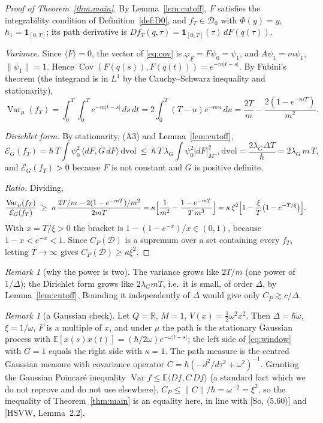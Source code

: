 \documentclass[11pt,a4paper]{article}
\theoremstyle{definition}
\theoremstyle{remark}
\newtheorem{remark}[theorem]{Remark}
\newcommand{\E}{\mathbb{E}}
\newcommand{\R}{\mathbb{R}}
\newcommand{\Var}{\operatorname{Var}}
\newcommand{\Cov}{\operatorname{Cov}}
\newcommand{\cE}{\mathcal{E}}
\newcommand{\cD}{\mathcal{D}}
\newcommand{\dvol}{\,\mathrm{dvol}}
\begin{document}
\begin{proof}[Proof of Theorem~\ref{thm:main}]
By Lemma~\ref{lem:cutoff}, $F$ satisfies the integrability condition of Definition~\ref{def:D0}, and $f_T\in\cD_0$ with $\Phi(y)=y$, $h_1=\mathbf 1_{[0,T]}$; its path derivative is $Df_T(q,\tau)=\mathbf 1_{[0,T]}(\tau)\,dF(q(\tau))$.

\emph{Variance.}
Since $\langle F\rangle=0$, the vector of \eqref{eq:cov} is $\varphi_F=F\psi_0=\psi_1$, and $A\psi_1=m\psi_1$, $\|\psi_1\|=1$.
Hence $\Cov(F(q(s)),F(q(t)))=e^{-m|t-s|}$.
By Fubini's theorem (the integrand is in $L^1$ by the Cauchy--Schwarz inequality and stationarity),
\[
  \Var_\mu(f_T)=\int_0^T\!\!\int_0^Te^{-m|t-s|}\,ds\,dt=2\int_0^T(T-u)e^{-mu}\,du=\frac{2T}{m}-\frac{2(1-e^{-mT})}{m^2}.
\]

\emph{Dirichlet form.}
By stationarity, (A3) and Lemma~\ref{lem:cutoff},
\[
  \cE_G(f_T)=\hbar\,T\int\psi_0^2\,\langle dF,G\,dF\rangle\dvol\ \le\ \hbar\,T\,\lambda_G\int\psi_0^2|dF|^2_{M^{-1}}\dvol=\frac{2\lambda_G\Delta T}{\hbar}=2\lambda_G\,m\,T ,
\]
and $\cE_G(f_T)>0$ because $F$ is not constant and $G$ is positive definite.

\emph{Ratio.}
Dividing,
\[
  \frac{\Var_\mu(f_T)}{\cE_G(f_T)}\ \ge\ \kappa\,\frac{2T/m-2(1-e^{-mT})/m^2}{2mT}=\kappa\Bigl[\frac1{m^2}-\frac{1-e^{-mT}}{T\,m^3}\Bigr]=\kappa\,\xi^2\Bigl[1-\frac{\xi}{T}\bigl(1-e^{-T/\xi}\bigr)\Bigr].
\]
With $x=T/\xi>0$ the bracket is $1-(1-e^{-x})/x\in(0,1)$, because $1-x<e^{-x}<1$.
Since $C_P(\cD)$ is a supremum over a set containing every $f_T$, letting $T\to\infty$ gives $C_P(\cD)\ge\kappa\xi^2$.
\end{proof}

\begin{remark}[why the power is two]\label{rem:power}
The variance grows like $2T/m$ (one power of $1/\Delta$); the Dirichlet form grows like $2\lambda_GmT$, i.e.\ it is small, of order $\Delta$, by Lemma~\ref{lem:cutoff}. Bounding it independently of $\Delta$ would give only $C_P\gtrsim c/\Delta$.
\end{remark}

\begin{remark}[a Gaussian check]\label{rem:gauss}
Let $Q=\R$, $M=1$, $V(x)=\tfrac12\omega^2x^2$. Then $\Delta=\hbar\omega$, $\xi=1/\omega$, $F$ is a multiple of $x$, and under $\mu$ the path is the stationary Gaussian process with $\E[x(s)x(t)]=(\hbar/2\omega)e^{-\omega|t-s|}$; the left side of \eqref{eq:window} with $G=1$ equals the right side with $\kappa=1$.
The path measure is the centred Gaussian measure with covariance operator $C=\hbar(-d^2/d\tau^2+\omega^2)^{-1}$.
Granting the Gaussian Poincar\'e inequality $\Var f\le\E\langle Df,C\,Df\rangle$ (a standard fact which we do not reprove and do not use elsewhere), $C_P\le\|C\|/\hbar=\omega^{-2}=\xi^2$, so the inequality of Theorem~\ref{thm:main} is an equality here, in line with [So, (5.60)] and [HSVW, Lemma~2.2].
\end{remark}
\end{document}
